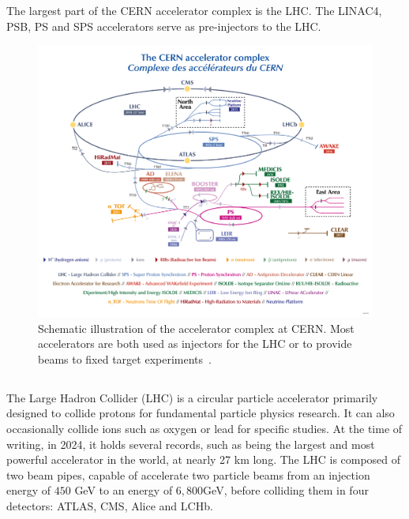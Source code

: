 The largest part of the CERN accelerator complex is the LHC. The LINAC4, PSB, PS and SPS
accelerators serve as pre-injectors to the LHC.

\begin{figure}[!htb]
    \centering
    \includegraphics[width=1\textwidth]{images/cern_complex.png}
    \caption{Schematic illustration of the accelerator complex at CERN. Most accelerators are both
    used as injectors for the LHC or to provide beams to fixed target
    experiments~\cite{noauthor_cern_2022}.}
    \label{fig:introduction:cern_complex}
\end{figure}


\subsection{}

The Large Hadron Collider (LHC) is a circular particle accelerator primarily designed to collide
protons for fundamental particle physics research. It can also occasionally collide ions such as
oxygen or lead for specific studies. At the time of writing, in 2024, it holds several records,
such as being the largest and most powerful accelerator in the world, at nearly 27 km long. The LHC
is composed of two beam pipes, capable of accelerate two particle beams from an injection energy
of $450$ GeV to an energy of $6,800$GeV, before colliding them in four detectors: ATLAS, CMS, Alice
and LCHb.

